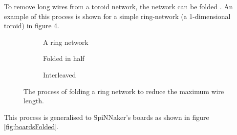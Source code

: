 			To remove long wires from a toroid network, the network can be folded
			\cite{dally04}. An example of this process is shown for a simple
			ring-network (a 1-dimensional toroid) in figure \ref{fig:folding}.
			
			\begin{figure}
				\begin{subfigure}[b]{\textwidth}
					\center
					
					\caption{A ring network}
					\label{fig:ringLong}
				\end{subfigure}
				
				\vspace{2ex}
				
				\begin{subfigure}[b]{\textwidth}
					\center
					
					\caption{Folded in half}
					\label{fig:ringFolded}
				\end{subfigure}
				
				\vspace{2ex}
				
				\begin{subfigure}[b]{\textwidth}
					\center
					
					\caption{Interleaved}
					\label{fig:ringInterleaved}
				\end{subfigure}
				
				\caption[Folding a ring network.]{The process of folding a ring network
				to reduce the maximum wire length.}
				\label{fig:folding}
			\end{figure}
			
			This process is generalised to SpiNNaker's boards as shown in figure
			\ref{fig:boardsFolded}.
			
